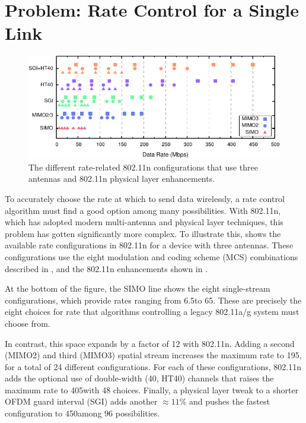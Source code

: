 \section{Problem: Rate Control for a Single Link}
\begin{figure}[t]
	\centering
	\includegraphics[width=\textwidth]{figures/rate_configs.pdf}
	\caption[The rate-related 802.11n configurations that use three antennas]{\label{fig:rate_configs}The different rate-related 802.11n configurations that use three antennas and 802.11n physical layer enhancements.}
\end{figure}

To accurately choose the rate at which to send data wirelessly, a rate control algorithm must find a good option among many possibilities. With 802.11n, which has adopted modern multi-antenna and physical layer techniques, this problem has gotten significantly more complex. To illustrate this,  shows the available rate configurations in 802.11n for a device with three antennas. These configurations use the eight modulation and coding scheme (MCS) combinations described in , and the 802.11n enhancements shown in .

At the bottom of the figure, the SIMO line shows the eight single-stream configurations, which provide rates ranging from 6.5\Mbps to 65\Mbps. These are precisely the eight choices for rate that algorithms controlling a legacy 802.11a/g system must choose from.

In contrast, this space expands by a factor of 12 with 802.11n. Adding a second (MIMO2) and third (MIMO3) spatial stream increases the maximum rate to 195\Mbps, for a total of 24 different configurations. For each of these configurations, 802.11n adds the optional use of double-width (40\MHz, HT40) channels that raises the maximum rate to 405\Mbps with 48 choices. Finally, a physical layer tweak to a shorter OFDM guard interval (SGI) adds another $\approx 11\%$ and pushes the fastest configuration to 450\Mbps among 96 possibilities.

